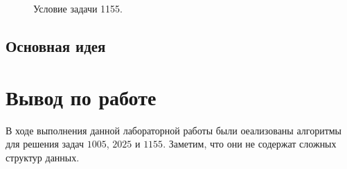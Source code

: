 \documentclass[a5paper, 10pt]{article}
\theoremstyle{definition}
\theoremstyle{plain}
\theoremstyle{remark}
\begin{document}
\begin{figure}[h]
\caption{Условие задачи 1155.}
\end{figure}

\subsection{Основная идея}

\newpage
\section{Вывод по работе}
В ходе выполнения данной лабораторной работы были оеализованы алгоритмы для решения задач $1005$, $2025$ и $1155$. Заметим, что они не содержат сложных структур данных.
\end{document}
